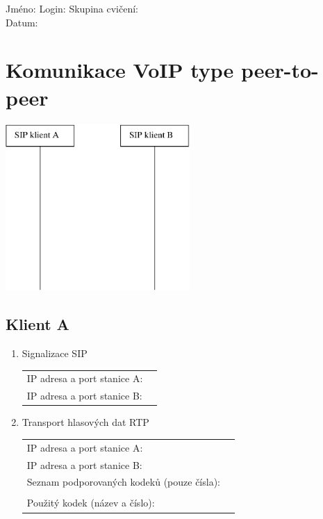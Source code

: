 Jméno: \hspace{4cm} Login: \hspace{4cm} Skupina cvičení:\\
Datum:

\section{Komunikace VoIP type peer-to-peer}
\begin{multicols}{2}
  \begin{center}
    \includegraphics[width=70mm]{peer-to-peer.eps}
  \end{center}
  \columnbreak
  \subsection*{Klient A}      
  \begin{enumerate}
    \item Signalizace SIP
    
    \begin{tabular}{lp{2cm}}
      IP adresa a port stanice A: &\\
      IP adresa a port stanice B: &\\
    \end{tabular}               
   
    \item Transport hlasových dat RTP
    
    \begin{tabular}{lp{2cm}}
      IP adresa a port stanice A: &\\
      IP adresa a port stanice B: &\\
      Seznam podporovaných kodeků (pouze čísla):&\\
      &\\
      Použitý kodek (název a číslo): &\\
    \end{tabular}               
  \end{enumerate}      
\end{multicols}

